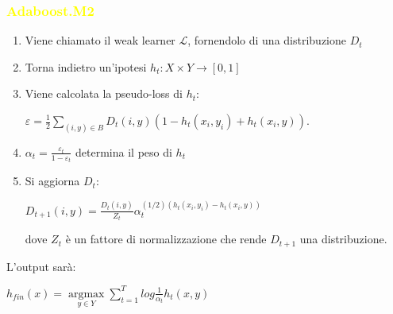 \documentclass[handout
]{beamer}
\def\yellow#1{{\textcolor{yellow}{#1}}}
\begin{document}
\begin{frame}
\frametitle{\yellow{Adaboost.M2}}

\begin{enumerate}

\item Viene chiamato il weak learner \begin{math} \mathcal{L} \end{math}, fornendolo di una distribuzione
    \begin{math} D_t\end{math} 
\item Torna indietro un'ipotesi  \begin{math}h_t : X \times Y \to \left[0,1\right]\end{math}
\item Viene calcolata la pseudo-loss di \begin{math}h_t\end{math}:
\begin{center}
\begin{math}\varepsilon = \frac{1}{2} \sum_{(i,y)\in B}D_t(i,y)(1-h_t(x_i,y_i)+h_t(x_i,y))\end{math}.
\end{center}                      
\item \begin{math} \alpha_t=\frac{\varepsilon_t}{1-\varepsilon_t}  \end{math} determina il peso di \begin{math} h_t\end{math}

\item Si aggiorna \begin{math}D_t\end{math}:
\begin{center}
 \begin{math}
  D_{t+1}(i,y)=\frac{D_t(i,y)}{Z_t}\alpha_t^{(1/2)(h_t(x_i,y_i)-h_t(x_i,y))}
 \end{math}

\end{center}
                             
dove \begin{math}Z_t \end{math} \`e un fattore di normalizzazione che rende \begin{math}D_{t+1} \end{math} 
una distribuzione.


\end{enumerate}
L'output sar\`a:
\begin{center}
\begin{math} h_{fin}(x)= \underset{y\in Y}{\operatorname{argmax}}\sum_{t=1}^T log\frac{1}{\alpha_t}h_t(x,y) \end{math}
\end{center}
\end{frame}
\end{document}
